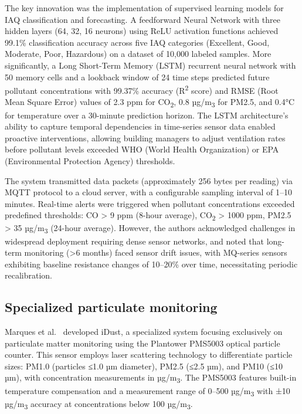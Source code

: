\documentclass[12pt]{report}
\begin{document}
The key innovation was the implementation of supervised learning models for IAQ classification and forecasting. A feedforward Neural Network with three hidden layers (64, 32, 16 neurons) using ReLU activation functions achieved 99.1\% classification accuracy across five IAQ categories (Excellent, Good, Moderate, Poor, Hazardous) on a dataset of 10,000 labeled samples. More significantly, a Long Short-Term Memory (LSTM) recurrent neural network with 50 memory cells and a lookback window of 24 time steps predicted future pollutant concentrations with 99.37\% accuracy (R\textsuperscript{2} score) and RMSE (Root Mean Square Error) values of 2.3 ppm for CO\textsubscript{2}, 0.8 µg/m\textsubscript{3} for PM2.5, and 0.4°C for temperature over a 30-minute prediction horizon. The LSTM architecture's ability to capture temporal dependencies in time-series sensor data enabled proactive interventions, allowing building managers to adjust ventilation rates before pollutant levels exceeded WHO (World Health Organization) or EPA (Environmental Protection Agency) thresholds.

The system transmitted data packets (approximately 256 bytes per reading) via MQTT protocol to a cloud server, with a configurable sampling interval of 1--10 minutes. Real-time alerts were triggered when pollutant concentrations exceeded predefined thresholds: CO > 9 ppm (8-hour average), CO\textsubscript{2} > 1000 ppm, PM2.5 > 35 µg/m\textsubscript{3} (24-hour average). However, the authors acknowledged challenges in widespread deployment requiring dense sensor networks, and noted that long-term monitoring (>6 months) faced sensor drift issues, with MQ-series sensors exhibiting baseline resistance changes of 10--20\% over time, necessitating periodic recalibration.

\subsection{Specialized particulate monitoring}
Marques et al.~\cite{marques2018} developed iDust, a specialized system focusing exclusively on particulate matter monitoring using the Plantower PMS5003 optical particle counter. This sensor employs laser scattering technology to differentiate particle sizes: PM1.0 (particles ≤1.0 µm diameter), PM2.5 (≤2.5 µm), and PM10 (≤10 µm), with concentration measurements in µg/m\textsubscript{3}. The PMS5003 features built-in temperature compensation and a measurement range of 0--500 µg/m\textsubscript{3} with ±10 µg/m\textsubscript{3} accuracy at concentrations below 100 µg/m\textsubscript{3}.
\end{document}
